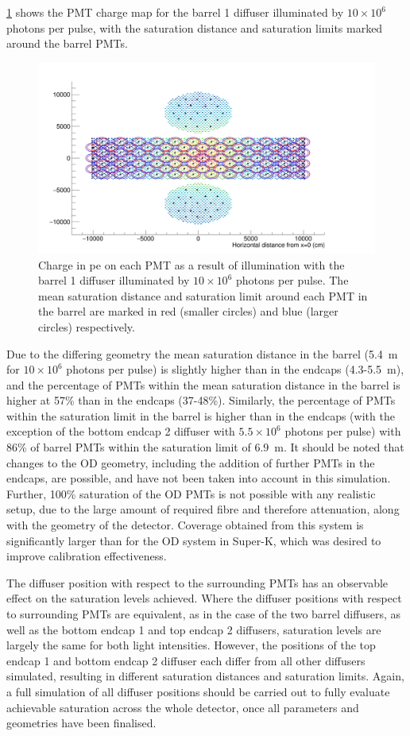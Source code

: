 \documentclass[a4paper,11pt]{article}
\begin{document}
\cref{fig:pmtmap_with_limits} shows the PMT charge map for the barrel 1 diffuser illuminated by $10\times10^6$ photons per pulse, with the saturation distance and saturation limits marked around the barrel PMTs.

\begin{figure}[ht!]
\centering
\includegraphics[width=0.7\linewidth]{diffuse_QCoverage_with_limits.png}
         \caption{Charge in pe on each PMT as a result of illumination with the barrel 1 diffuser illuminated by $10\times10^6$ photons per pulse. The mean saturation distance and saturation limit around each PMT in the barrel are marked in red (smaller circles) and blue (larger circles) respectively.}
         \label{fig:pmtmap_with_limits}
\end{figure}

Due to the differing geometry the mean saturation distance in the barrel (5.4~m for $10\times10^6$ photons per pulse) is slightly higher than in the endcaps (4.3-5.5~m), and the percentage of PMTs within the mean saturation distance in the barrel is higher at 57\% than in the endcaps (37-48\%). Similarly, the percentage of PMTs within the saturation limit in the barrel is higher than in the endcaps (with the exception of the bottom endcap 2 diffuser with $5.5\times10^6$ photons per pulse) with 86\% of barrel PMTs within the saturation limit of 6.9~m. It should be noted that changes to the OD geometry, including the addition of further PMTs in the endcaps, are possible, and have not been taken into account in this simulation. Further, 100\% saturation of the OD PMTs is not possible with any realistic setup, due to the large amount of required fibre and therefore attenuation, along with the geometry of the detector. Coverage obtained from this system is significantly larger than for the OD system in Super-K, which was desired to improve calibration effectiveness.

The diffuser position with respect to the surrounding PMTs has an observable effect on the saturation levels achieved. Where the diffuser positions with respect to surrounding PMTs are equivalent, as in the case of the two barrel diffusers, as well as the bottom endcap 1 and top endcap 2 diffusers, saturation levels are largely the same for both light intensities. However, the positions of the top endcap 1 and bottom endcap 2 diffuser each differ from all other diffusers simulated, resulting in different saturation distances and saturation limits. Again, a full simulation of all diffuser positions should be carried out to fully evaluate achievable saturation across the whole detector, once all parameters and geometries have been finalised.
\end{document}
